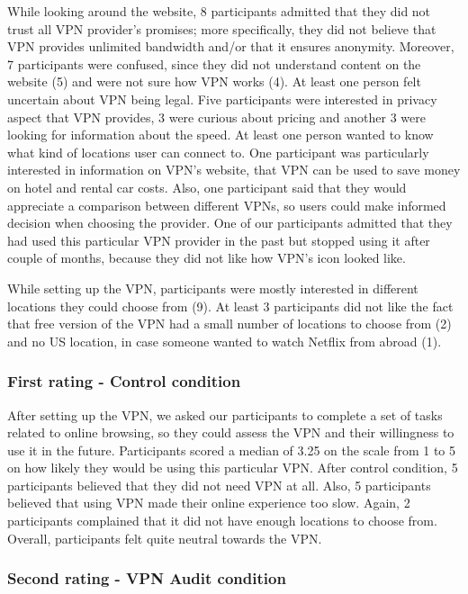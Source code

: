 While looking around the website, 8 participants admitted that they did not
trust all VPN provider's promises; more specifically, they did not believe
that VPN provides unlimited bandwidth and/or that it ensures anonymity.
Moreover, 7 participants were confused, since they did not understand content
on the website (5) and were not sure how VPN works (4). At least one person
felt uncertain about VPN being legal. Five participants were interested in
privacy aspect that VPN provides, 3 were curious about pricing and another 3
were looking for information about the speed. At least one person wanted to
know what kind of locations user can connect to. One participant was
particularly interested in information on VPN's website, that VPN can be used
to save money on hotel and rental car costs.  Also, one participant said that
they would appreciate a comparison between different VPNs, so users could make
informed decision when choosing the provider. One of our participants admitted
that they had used this particular VPN provider in the past but stopped using
it after couple of months, because they did not like how VPN's icon looked
like. 

While setting up the VPN, participants were mostly interested in different
locations they could choose from (9). At least 3 participants did not like the
fact that free version of the VPN had a small number of locations to choose
from (2) and no US location, in case someone wanted to watch Netflix from
abroad (1).


\subsubsection{First rating - Control condition}

After setting up the VPN, we asked our participants to complete a set of tasks
related to online browsing, so they could assess the VPN and their willingness
to use it in the future. Participants scored a median of 3.25 on the scale
from 1 to 5 on how likely they would be using this particular VPN. After
control condition, 5 participants believed that they did not need VPN at all.
Also, 5 participants believed that using VPN made their online experience too
slow. Again, 2 participants complained that it did not have enough locations
to choose from. Overall, participants felt quite neutral towards the VPN.


\subsubsection{Second rating - VPN Audit condition}


